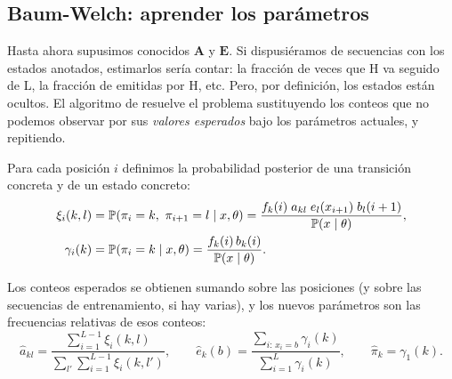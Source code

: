 \subsection{Baum-Welch: aprender los parámetros}

Hasta ahora supusimos conocidos $\mathbf{A}$ y $\mathbf{E}$. Si dispusiéramos de secuencias con los estados anotados, estimarlos sería contar: la fracción de veces que \textsf{H} va seguido de \textsf{L}, la fracción de  emitidas por \textsf{H}, etc. Pero, por definición, los estados están ocultos. El algoritmo de \textcite{c04-baum1970} resuelve el problema sustituyendo los conteos que no podemos observar por sus \emph{valores esperados} bajo los parámetros actuales, y repitiendo.

Para cada posición $i$ definimos la probabilidad posterior de una transición concreta y de un estado concreto:
\begin{align}
\xi_i(k,l) &= \mathbb{P}(\pi_i=k,\ \pi_{i+1}=l\mid x,\theta) = \frac{f_k(i)\;a_{kl}\;e_l(x_{i+1})\;b_l(i+1)}{\mathbb{P}(x\mid\theta)}, \label{eq:04-xi}\\
\gamma_i(k) &= \mathbb{P}(\pi_i=k\mid x,\theta) = \frac{f_k(i)\,b_k(i)}{\mathbb{P}(x\mid\theta)}. \label{eq:04-gamma}
\end{align}

\begin{simbolos}
\end{simbolos}

\noindent Los conteos esperados se obtienen sumando sobre las posiciones (y sobre las secuencias de entrenamiento, si hay varias), y los nuevos parámetros son las frecuencias relativas de esos conteos:
\begin{equation}\label{eq:04-bw}
\hat a_{kl} = \frac{\sum_{i=1}^{L-1}\xi_i(k,l)}{\sum_{l'}\sum_{i=1}^{L-1}\xi_i(k,l')},\qquad
\hat e_k(b) = \frac{\sum_{i:\,x_i=b}\gamma_i(k)}{\sum_{i=1}^{L}\gamma_i(k)},\qquad
\hat\pi_k=\gamma_1(k).
\end{equation}

\begin{simbolos}
\end{simbolos}

